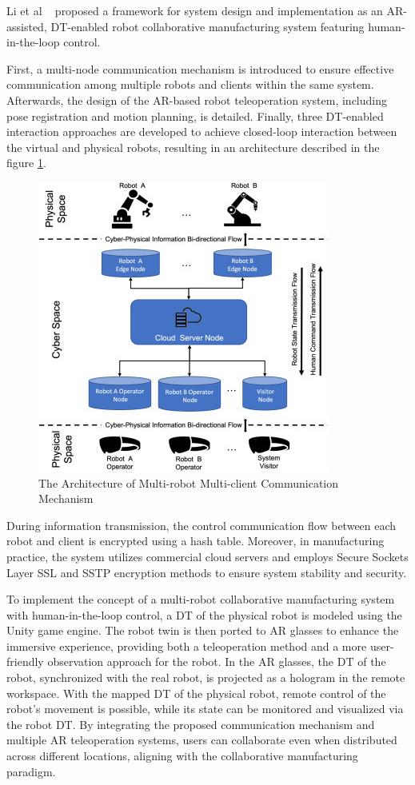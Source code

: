     Li et al ~\cite{this-article} proposed a framework for system design and implementation as an \ac{AR}-assisted, \ac{DT}-enabled robot collaborative manufacturing system featuring human-in-the-loop control.
    
    First, a multi-node communication mechanism is introduced to ensure effective communication among multiple robots and clients within the same system. Afterwards, the design of the \ac{AR}-based robot teleoperation system, including pose registration and motion planning, is detailed. Finally, three \ac{DT}-enabled interaction approaches are developed to achieve closed-loop interaction between the virtual and physical robots, resulting in an architecture described in the figure \ref{f:system-framework}.

    \begin{figure}[!htpb]
        \centering
        \includegraphics[width=0.5\linewidth]{figs/framework.jpg}
        \caption{The Architecture of Multi-robot Multi-client Communication Mechanism \cite{LI2022102321}}
        \label{f:system-framework}
    \end{figure}

    During information transmission, the control communication flow between each robot and client is encrypted using a hash table. Moreover, in manufacturing practice, the system utilizes commercial cloud servers and employs Secure Sockets Layer \ac{SSL} and \ac{SSTP} encryption methods to ensure system stability and security.

    To implement the concept of a multi-robot collaborative manufacturing system with human-in-the-loop control, a \ac{DT} of the physical robot is modeled using the Unity game engine. The robot twin is then ported to \ac{AR} glasses to enhance the immersive experience, providing both a teleoperation method and a more user-friendly observation approach for the robot. In the \ac{AR} glasses, the \ac{DT} of the robot, synchronized with the real robot, is projected as a hologram in the remote workspace. With the mapped \ac{DT} of the physical robot, remote control of the robot's movement is possible, while its state can be monitored and visualized via the robot \ac{DT}. By integrating the proposed communication mechanism and multiple \ac{AR} teleoperation systems, users can collaborate even when distributed across different locations, aligning with the collaborative manufacturing paradigm.

